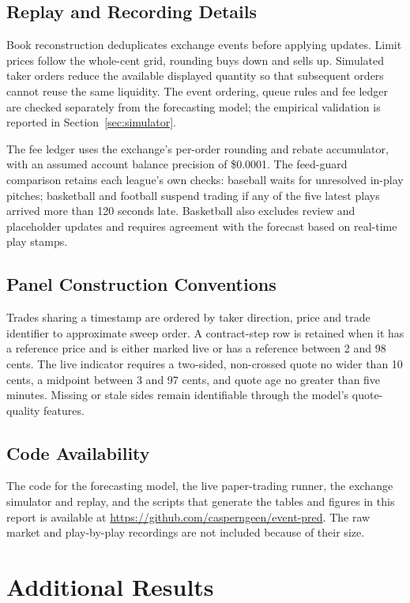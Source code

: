 \documentclass[12pt,a4paper,oneside]{report}
\begin{document}
\section{Replay and Recording Details}\label{sec:sim-implementation}
Book reconstruction deduplicates exchange events before applying updates.
Limit prices follow the whole-cent grid, rounding buys down and sells up.
Simulated taker orders reduce the available displayed quantity so that
subsequent orders cannot reuse the same liquidity. The event ordering,
queue rules and fee ledger are checked separately from the forecasting model;
the empirical validation is reported in Section~\ref{sec:simulator}.

The fee ledger uses the exchange's per-order rounding and rebate accumulator,
with an assumed account balance precision of \$0.0001. The feed-guard comparison
retains each league's own checks: baseball waits for unresolved in-play pitches;
basketball and football suspend trading if any of the five latest plays arrived
more than 120 seconds late. Basketball also excludes review and placeholder
updates and requires agreement with the forecast based on real-time play stamps.

\section{Panel Construction Conventions}\label{sec:panel-conventions}
Trades sharing a timestamp are ordered by taker direction, price and trade
identifier to approximate sweep order. A contract-step row is retained when
it has a reference price and is either marked live or has a reference between
2 and 98 cents. The live indicator requires a two-sided, non-crossed quote
no wider than 10 cents, a midpoint between 3 and 97 cents, and quote age no
greater than five minutes. Missing or stale sides remain identifiable through
the model's quote-quality features.

\section{Code Availability}\label{sec:code-availability}
The code for the forecasting model, the live paper-trading runner, the exchange
simulator and replay, and the scripts that generate the tables and figures in
this report is available at \url{https://github.com/casperngeen/event-pred}.
The raw market and play-by-play recordings are not included because of their size.

\chapter{Additional Results}
\end{document}
